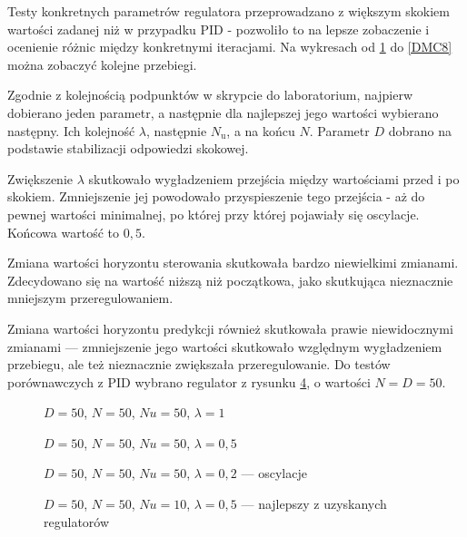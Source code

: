 Testy konkretnych parametrów regulatora przeprowadzano z większym skokiem wartości zadanej niż w przypadku PID - pozwoliło to na lepsze zobaczenie i ocenienie różnic między konkretnymi iteracjami. Na wykresach od \ref{DMC3} do \ref{DMC8} można zobaczyć kolejne przebiegi.

Zgodnie z kolejnością podpunktów w skrypcie do laboratorium, najpierw dobierano jeden parametr, a następnie dla najlepszej jego wartości wybierano następny. Ich kolejność $ \lambda $, następnie $ N_\mathrm{u} $, a na końcu $ N $. Parametr $ D $ dobrano na podstawie stabilizacji odpowiedzi skokowej.

Zwiększenie $ \lambda $ skutkowało wygładzeniem przejścia między wartościami przed i po skokiem. Zmniejszenie jej powodowało przyspieszenie tego przejścia - aż do pewnej wartości minimalnej, po której przy której pojawiały się oscylacje. Końcowa wartość to $ 0,5 $.

Zmiana wartości horyzontu sterowania skutkowała bardzo niewielkimi zmianami. Zdecydowano się na wartość niższą niż początkowa, jako skutkująca nieznacznie mniejszym przeregulowaniem.

Zmiana wartości horyzontu predykcji również skutkowała prawie niewidocznymi zmianami --- zmniejszenie jego wartości skutkowało względnym wygładzeniem przebiegu, ale też nieznacznie zwiększała przeregulowanie. Do testów porównawczych z PID wybrano regulator z rysunku \ref{DMC6}, o wartości $ N = D = 50 $.

\begin{figure}[H]
\centering

\caption{$ D = 50 $, $  N = 50 $, $ Nu = 50 $, $ \lambda = 1 $}
\label{DMC3}
\end{figure}

\begin{figure}[H]
\centering

\caption{$ D = 50 $, $  N = 50 $, $ Nu = 50 $, $ \lambda = 0,5 $}
\label{DMC4}
\end{figure}

\begin{figure}[H]
\centering

\caption{$ D = 50 $, $  N = 50 $, $ Nu = 50 $, $ \lambda = 0,2 $ --- oscylacje}
\label{DMC5}
\end{figure}

\begin{figure}[H]
\centering

\caption{$ D = 50 $, $  N = 50 $, $ Nu = 10 $, $ \lambda = 0,5 $ --- najlepszy z uzyskanych regulatorów}
\label{DMC6}
\end{figure}

